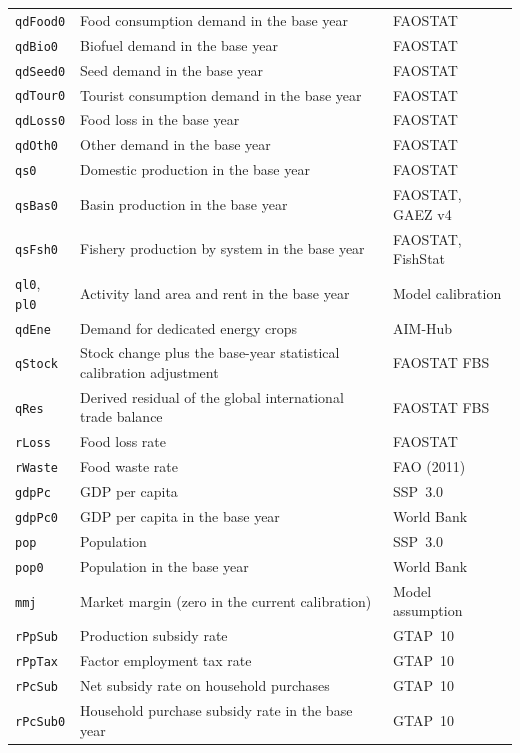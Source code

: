 \begin{xltabular}{\linewidth}{l X l}
  \texttt{qdFood0} & Food consumption demand in the base year & FAOSTAT \\
  \texttt{qdBio0} & Biofuel demand in the base year & FAOSTAT \\
  \texttt{qdSeed0} & Seed demand in the base year & FAOSTAT \\
  \texttt{qdTour0} & Tourist consumption demand in the base year & FAOSTAT \\
  \texttt{qdLoss0} & Food loss in the base year & FAOSTAT \\
  \texttt{qdOth0} & Other demand in the base year & FAOSTAT \\
  \texttt{qs0} & Domestic production in the base year & FAOSTAT \\
  \texttt{qsBas0} & Basin production in the base year & FAOSTAT, GAEZ v4 \\
  \texttt{qsFsh0} & Fishery production by system in the base year & FAOSTAT, FishStat \\
  \texttt{ql0}, \texttt{pl0} & Activity land area and rent in the base year & Model calibration \\
  \texttt{qdEne} & Demand for dedicated energy crops & AIM-Hub \\
  \texttt{qStock} & Stock change plus the base-year statistical calibration adjustment & FAOSTAT FBS \\
  \texttt{qRes} & Derived residual of the global international trade balance & FAOSTAT FBS \\
  \texttt{rLoss} & Food loss rate & FAOSTAT \\
  \texttt{rWaste} & Food waste rate & FAO (2011) \\
  \texttt{gdpPc} & GDP per capita & SSP~3.0~\cite{crespocuaresmaIncomeProjectionsClimate2017} \\
  \texttt{gdpPc0} & GDP per capita in the base year & World Bank \\
  \texttt{pop} & Population & SSP~3.0~\cite{kcWittgensteinCenterWIC2024} \\
  \texttt{pop0} & Population in the base year & World Bank \\
  \texttt{mmj} & Market margin (zero in the current calibration) & Model assumption \\
  \texttt{rPpSub} & Production subsidy rate & GTAP~10 \\
  \texttt{rPpTax} & Factor employment tax rate & GTAP~10 \\
  \texttt{rPcSub} & Net subsidy rate on household purchases & GTAP~10 \\
  \texttt{rPcSub0} & Household purchase subsidy rate in the base year & GTAP~10 \\

\end{xltabular}
